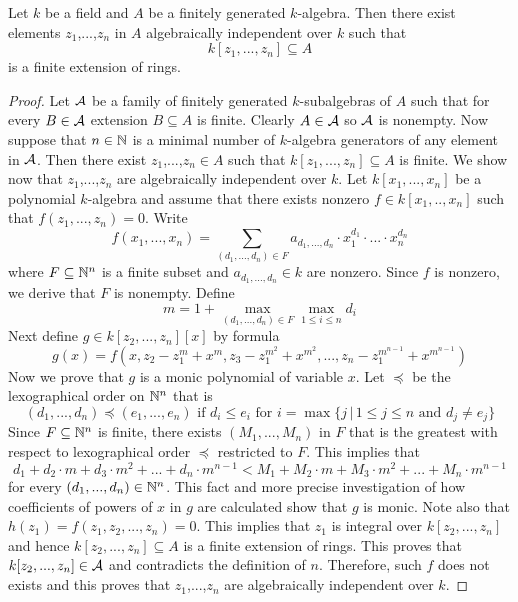 \begin{theorem}\label{theorem:noethernormalizationlemma}
Let $k$ be a field and $A$ be a finitely generated $k$-algebra. Then there exist elements $z_1$,...,$z_n$ in $A$ algebraically independent over $k$ such that 
$$k[z_1,...,z_n]\subseteq A$$
is a finite extension of rings.
\end{theorem}
\begin{proof}
Let ${\mathcal A}$ be a family of finitely generated $k$-subalgebras of $A$ such that for every $B \in {\mathcal A}$ extension $B \subseteq A$ is finite. Clearly $A\in {\mathcal A}$ so ${\mathcal A}$ is nonempty. Now suppose that $n\in {\mathbb N}$ is a minimal number of $k$-algebra generators of any element in ${\mathcal A}$. Then there exist $z_1$,...,$z_n\in A$ such that $k[z_1,...,z_n]\subseteq A$ is finite. We show now that $z_1$,...,$z_n$ are algebraically independent over $k$. Let $k[x_1,...,x_n]$ be a polynomial $k$-algebra and assume that there exists nonzero $f\in k[x_1,..,x_n]$ such that $f(z_1,...,z_n)=0$. Write 
$$f(x_1,...,x_n) = \sum_{(d_1,...,d_n)\in F}a_{d_1,...,d_n}\cdot x_1^{d_1}\cdot...\cdot x_n^{d_n}$$
where $F\subseteq {\mathbb N}^n$ is a finite subset and $a_{d_1,...,d_n}\in k$ are nonzero. Since $f$ is nonzero, we derive that $F$ is nonempty. Define 
$$m = 1+\max_{(d_1,...,d_n)\in F} \max_{1\leq i\leq n}d_i$$
Next define $g\in k[z_2,...,z_n][x]$ by formula 
$$g(x) = f(x,z_2-z_1^m+x^m,z_3-z_1^{m^2}+x^{m^2},...,z_n-z_1^{m^{n-1}}+x^{m^{n-1}})$$ 
Now we prove that $g$ is a monic polynomial of variable $x$. Let $\preceq$ be the lexographical order on ${\mathbb N}^n$ that is
$$(d_1,...,d_n)\preceq (e_1,...,e_n)\mbox{ if }d_i\leq e_i\mbox{ for }i = \max \big\{j\,\big|\,1\leq j\leq n\mbox{ and }d_j\neq e_j\big\}$$
Since $F\subseteq {\mathbb N}^n$ is finite, there exists $(M_1,...,M_n)$ in $F$ that is the greatest with respect to lexographical order $\preceq$ restricted to $F$. This implies that
$$d_1+d_2\cdot m+d_3\cdot m^2+...+d_n\cdot m^{n-1} < M_1+M_2\cdot m+M_3\cdot m^2+...+M_n\cdot m^{n-1}$$
for every $(d_1,...,d_n)\in {\mathbb N}^n$. This fact and more precise investigation of how coefficients of powers of $x$ in $g$ are calculated show that $g$ is monic. Note also that $h(z_1) = f(z_1,z_2,...,z_n)=0$. This implies that $z_1$ is integral over $k[z_2,...,z_n]$ and hence $k[z_2,...,z_n]\subseteq A$ is a finite extension of rings. This proves that $k[z_2,...,z_n]\in {\mathcal A}$ and contradicts the definition of $n$. Therefore, such $f$ does not exists and this proves that $z_1$,...,$z_n$ are algebraically independent over $k$.
\end{proof}

